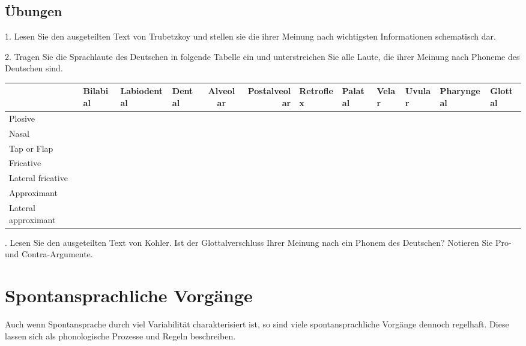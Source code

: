 \documentclass[11pt]{book}
\begin{document}
\newpage
\section{Übungen}

1.	Lesen Sie den ausgeteilten Text von Trubetzkoy und stellen sie die ihrer Meinung nach wichtigsten Informationen schematisch dar.\vspace{\fill}


2.	Tragen Sie die Sprachlaute des Deutschen in folgende Tabelle ein und unterstreichen Sie alle Laute, die ihrer Meinung nach Phoneme des Deutschen sind.

\begin{table}\centering
\small
\begin{tabular}{|l|l|l|lcr|l|l|l|l|l|l|}  \hline
 & Bilabial & Labiodental & Dental & Alveolar & Postalveolar & Retroflex & Palatal & Velar & Uvular & Pharyngeal & Glottal\\ \hline
Plosive	&	&	&	&	&	&	&	&	&	&	& \\ \hline
Nasal	&	&	&	&	&	&	&	&	&	&	& \\ \hline
Tap or Flap	&	&	&	&	&	&	&	&	&	&	& \\ \hline
Fricative	&	&	&	&	&	&	&	&	& 	&	& \\ \hline
Lateral fricative	&	&	&	&	&	&	&	&	&	&	& \\ \hline
Approximant	&	&	&	&	&	&	&	&	&	&	& \\ \hline
Lateral approximant	&	&	&	&	&	&	&	&	&	&	& \\ \hline


\end{tabular}
\end{table}

.	Lesen Sie den ausgeteilten Text von Kohler. Ist der Glottalverschluss Ihrer Meinung nach ein Phonem des Deutschen? Notieren Sie Pro- und Contra-Argumente. \vspace{5cm}\\







\chapter{Spontansprachliche Vorgänge}

Auch wenn Spontansprache durch viel Variabilität charakterisiert ist, so sind viele spontansprachliche Vorgänge dennoch regelhaft. Diese lassen sich als phonologische Prozesse und Regeln beschreiben.
\end{document}
